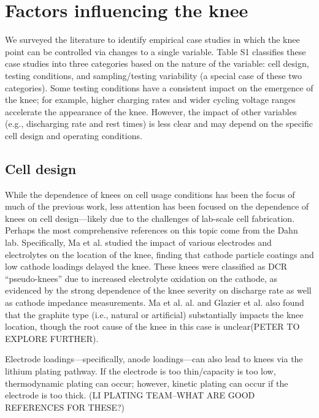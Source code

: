 \documentclass{article}
\begin{document}
\section{Factors influencing the knee}

We surveyed the literature to identify empirical case studies in which the knee point can be controlled via changes to a single variable. Table S1 classifies these case studies into three categories based on the nature of the variable: cell design, testing conditions, and sampling/testing variability (a special case of these two categories). Some testing conditions have a consistent impact on the emergence of the knee; for example, higher charging rates and wider cycling voltage ranges accelerate the appearance of the knee. However, the impact of other variables (e.g., discharging rate and rest times) is less clear and may depend on the specific cell design and operating conditions.

\subsection{Cell design}

While the dependence of knees on cell usage conditions has been the focus of much of the previous work, less attention has been focused on the dependence of knees on cell design---likely due to the challenges of lab-scale cell fabrication. Perhaps the most comprehensive references on this topic come from the Dahn lab. Specifically, Ma et al.\cite{ma_editors_2019} studied the impact of various electrodes and electrolytes on the location of the knee, finding that cathode particle coatings and low cathode loadings delayed the knee. These knees were classified as DCR ``pseudo-knees'' due to increased electrolyte oxidation on the cathode, as evidenced by the strong dependence of the knee severity on discharge rate as well as cathode impedance measurements. Ma et al. al.\cite{ma_editors_2019} and Glazier et al.\cite{glazier_analysis_2017} also found that the graphite type (i.e., natural or artificial) substantially impacts the knee location, though the root cause of the knee in this case is unclear(PETER TO EXPLORE FURTHER).

Electrode loadings---specifically, anode loadings---can also lead to knees via the lithium plating pathway.
If the electrode is too thin/capacity is too low, thermodynamic plating can occur; however, kinetic plating can occur if the electrode is too thick. (LI PLATING TEAM--WHAT ARE GOOD REFERENCES FOR THESE?)
\end{document}
